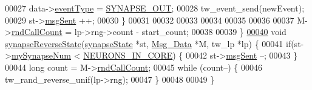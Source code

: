 \begin{DoxyCode}
00027             data->\hyperlink{struct_msg___data_a015b6eb45982e1842ee8fc389a099ced}{eventType} = \hyperlink{assist_8h_a7c1688de451e0dea1e11617bce3ec450a6ad6b93d8a818550e7246f6e0d143afb}{SYNAPSE\_OUT};
00028             tw\_event\_send(newEvent);
00029         st->\hyperlink{structsynapse_state_a7d208d07285a221f4ef19f6fa307b536}{msgSent} ++;
00030         \}
00031 
00032 
00033 
00034 
00035 
00036 
00037     M->\hyperlink{struct_msg___data_a2e49a6bcc6c45ade722f746b1ea707f2}{rndCallCount} = lp->rng->count - start\_count;
00038 
00039 \}
\hypertarget{synapse_8c_source_l00040}{}\hyperlink{synapse_8h_a8f9aab389278863b114c27bc10257864}{00040} \textcolor{keywordtype}{void} \hyperlink{synapse_8c_a8f9aab389278863b114c27bc10257864}{synapseReverseState}(\hyperlink{structsynapse_state}{synapseState} *st, 
      \hyperlink{struct_msg___data}{Msg\_Data} *M, tw\_lp *lp) \{
00041     \textcolor{keywordflow}{if}(st->\hyperlink{structsynapse_state_ab73db495221608d3eae73d51670d29f0}{mySynapseNum} < \hyperlink{assist_8h_a67e8e45768f76b984a60fcff2b7c51aa}{NEURONS\_IN\_CORE}) \{
00042         st->\hyperlink{structsynapse_state_a7d208d07285a221f4ef19f6fa307b536}{msgSent} --;
00043     \}
00044     \textcolor{keywordtype}{long} count = M->\hyperlink{struct_msg___data_a2e49a6bcc6c45ade722f746b1ea707f2}{rndCallCount};
00045     \textcolor{keywordflow}{while} (count--) \{
00046         tw\_rand\_reverse\_unif(lp->rng);
00047     \}
00048 
00049 \}
\end{DoxyCode}
